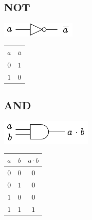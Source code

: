 
\begin{multicols}{4}

	\subsection*{NOT}
	\begin{minipage}[t][2em][c]{\linewidth}
		\centering
		\includegraphics{fig.not.pdf}
	\end{minipage}
	\begin{center}
		\begin{tabular}{c|c}
			\toprule
			$a$ & $\overline{a}$ \\
			\midrule
			$0$ & $1$            \\
			$1$ & $0$            \\
			\bottomrule
		\end{tabular}
	\end{center}

	\newcolumn

	\subsection*{AND}

	\begin{minipage}[t][2em][c]{\linewidth}
		\centering
		\includegraphics{fig.and.pdf}
	\end{minipage}
	\begin{center}
		\begin{tabular}{cc|c}
			\toprule
			$a$ & $b$ & $a\cdot b$ \\
			\midrule
			$0$ & $0$ & $0$        \\
			$0$ & $1$ & $0$        \\
			$1$ & $0$ & $0$        \\
			$1$ & $1$ & $1$        \\
			\bottomrule
		\end{tabular}
	\end{center}


\end{multicols}
